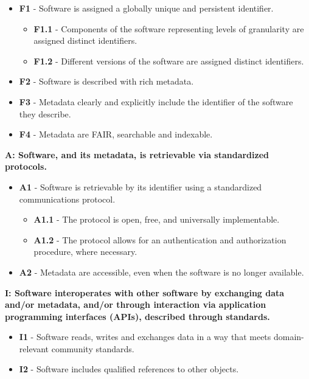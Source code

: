 \begin{itemize}
    \item \textbf{F1} - Software is assigned a globally unique and persistent identifier.
    \begin{itemize}
        \item \textbf{F1.1} - Components of the software representing levels of granularity are assigned distinct identifiers.
        \item \textbf{F1.2} - Different versions of the software are assigned distinct identifiers.
    \end{itemize}

    \item \textbf{F2} - Software is described with rich metadata.
    \item \textbf{F3} - Metadata clearly and explicitly include the identifier of the software they describe.
    \item \textbf{F4} - Metadata are FAIR, searchable and indexable.
\end{itemize}

\textbf{A: Software, and its metadata, is retrievable via standardized protocols.}

\begin{itemize}
    \item \textbf{A1} - Software is retrievable by its identifier using a standardized communications protocol.

    \begin{itemize}
        \item \textbf{A1.1} - The protocol is open, free, and universally implementable.
        \item \textbf{A1.2} - The protocol allows for an authentication and authorization procedure, where necessary.
    \end{itemize}

    \item \textbf{A2} - Metadata are accessible, even when the software is no longer available.
\end{itemize}

\textbf{I: Software interoperates with other software by exchanging data and/or metadata, and/or
through interaction via application programming interfaces (APIs), described through
standards.}

\begin{itemize}
    \item \textbf{I1} - Software reads, writes and exchanges data in a way that meets domain-relevant community standards.
    \item \textbf{I2} - Software includes qualified references to other objects.
\end{itemize}

